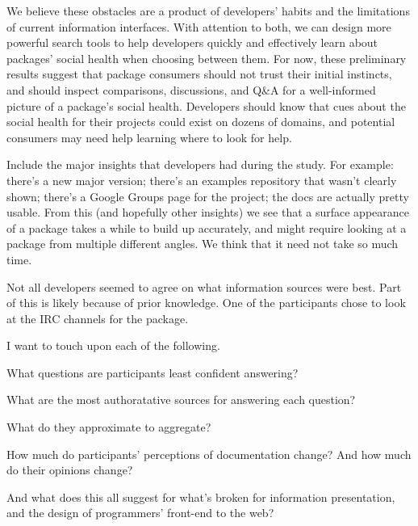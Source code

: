 We believe these obstacles are a product of developers' habits and the limitations of current information interfaces.
With attention to both, we can design more powerful search tools to help developers quickly and effectively learn about packages' social health when choosing between them.
For now, these preliminary results suggest that
package consumers should not trust their initial instincts,
and should inspect comparisons, discussions, and Q\&A for a well-informed picture of a package's social health.
Developers should know that cues about the social health for their projects could exist on dozens of domains,
and potential consumers may need help learning where to look for help.

Include the major insights that developers had during the study.
For example:
there's a new major version;
there's an examples repository that wasn't clearly shown;
there's a Google Groups page for the project;
the docs are actually pretty usable.
From this (and hopefully other insights) we see that a surface appearance of a package takes a while to build up accurately, and might require looking at a package from multiple different angles.
We think that it need not take so much time.

Not all developers seemed to agree on what information sources were best.
Part of this is likely because of prior knowledge.
One of the participants chose to look at the IRC channels for the package.

I want to touch upon each of the following.

What questions are participants least confident answering?

What are the most authoratative sources for answering each question?

What do they approximate to aggregate?

How much do participants' perceptions of documentation change?  And how much do their opinions change?

And what does this all suggest for what's broken for information presentation, and the design of programmers' front-end to the web?
\fi
